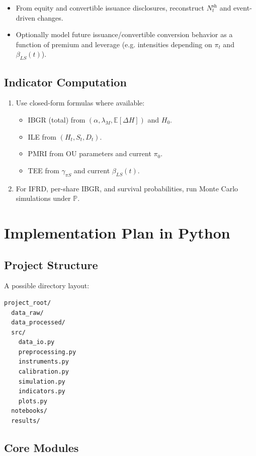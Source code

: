 \documentclass[11pt]{article}
\begin{document}
\begin{itemize}
  \item From equity and convertible issuance disclosures, reconstruct
        $N_t^{\text{sh}}$ and event-driven changes.
  \item Optionally model future issuance/convertible conversion behavior as a function of premium and leverage (e.g. intensities depending on $\pi_t$ and $\beta_{LS}(t)$).
\end{itemize}

\subsection{Indicator Computation}

\begin{enumerate}
  \item Use closed-form formulas where available:
  \begin{itemize}
    \item IBGR (total) from $(\alpha,\lambda_M,\mathbb E[\Delta H])$ and $H_0$.
    \item ILE from $(H_t,S_t,D_t)$.
    \item PMRI from OU parameters and current $\pi_0$.
    \item TEE from $\gamma_{\pi S}$ and current $\beta_{LS}(t)$.
  \end{itemize}
  \item For IFRD, per-share IBGR, and survival probabilities, run Monte Carlo simulations under $\mathbb P$.
\end{enumerate}

\section{Implementation Plan in Python}

\subsection{Project Structure}

A possible directory layout:
\begin{verbatim}
project_root/
  data_raw/
  data_processed/
  src/
    data_io.py
    preprocessing.py
    instruments.py
    calibration.py
    simulation.py
    indicators.py
    plots.py
  notebooks/
  results/
\end{verbatim}

\subsection{Core Modules}
\end{document}
